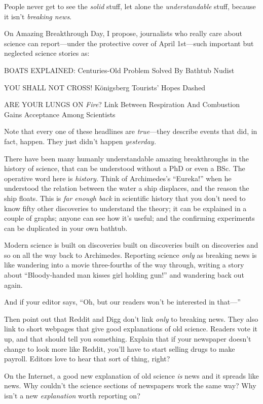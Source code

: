 {
 People never get to see the \textit{solid} stuff, let alone the
\textit{understandable} stuff, because it isn't
\textit{breaking news}.}

{
 On Amazing Breakthrough Day, I propose, journalists who really
care about science can report---under the protective cover of April
1st---such important but neglected science stories as:}

{
 BOATS EXPLAINED: Centuries-Old Problem Solved By Bathtub Nudist}

{
 YOU SHALL NOT CROSS! Königsberg Tourists' Hopes
Dashed}

{
 ARE YOUR LUNGS ON \textit{Fire}? Link Between Respiration And
Combustion Gains Acceptance Among Scientists}

{
 Note that every one of these headlines are \textit{true}{}---they
describe events that did, in fact, happen. They just
didn't happen \textit{yesterday.}}

{
 There have been many humanly understandable amazing breakthroughs
in the history of science, that can be understood without a PhD or even
a BSc. The operative word here is \textit{history}. Think of
Archimedes's
``Eureka!'' when he understood the
relation between the water a ship displaces, and the reason the ship
floats. This is \textit{far enough back} in scientific history that you
don't need to know fifty other discoveries to
understand the theory; it can be explained in a couple of graphs;
anyone can see how it's useful; and the confirming
experiments can be duplicated in your own bathtub.}

{
 Modern science is built on discoveries built on discoveries built
on discoveries and so on all the way back to Archimedes. Reporting
science \textit{only} as breaking news is like wandering into a movie
three-fourths of the way through, writing a story about
``Bloody-handed man kisses girl holding
gun!'' and wandering back out again.}

{
 And if your editor says, ``Oh, but our readers
won't be interested in that---''}

{
 Then point out that Reddit and Digg don't link
\textit{only} to breaking news. They also link to short webpages that
give good explanations of old science. Readers vote it up, and that
should tell you something. Explain that if your newspaper
doesn't change to look more like Reddit,
you'll have to start selling drugs to make payroll.
Editors love to hear that sort of thing, right?}

{
 On the Internet, a good new explanation of old science \textit{is}
news and it spreads like news. Why couldn't the science
sections of newspapers work the same way? Why isn't a
new \textit{explanation} worth reporting on?}


